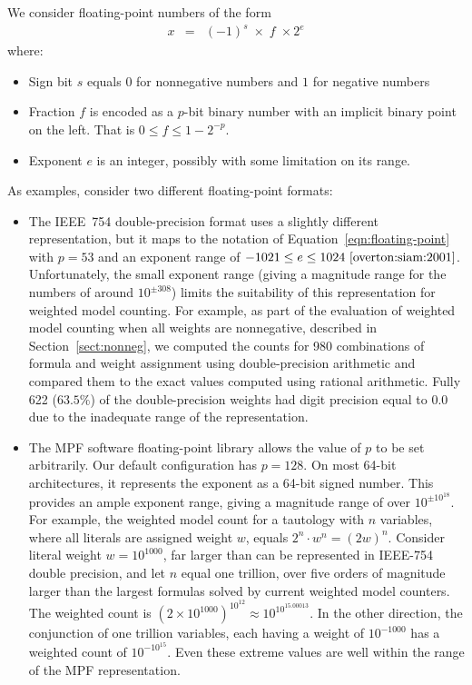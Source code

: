 \documentclass[letterpaper,USenglish,cleveref, autoref, thm-restate]{lipics-v2021}
\begin{document}
We consider floating-point numbers of the form
\begin{eqnarray}
x & = & (-1)^s \; \times \; f \; \times 2^{e} \label{eqn:floating-point}
\end{eqnarray}
where:
\begin{itemize}
\item Sign bit $s$ equals $0$ for nonnegative numbers and $1$ for negative numbers
\item Fraction $f$ is encoded as a $p$-bit binary number with an implicit binary point on the left.  That is $0 \leq f \leq 1-2^{-p}$.
\item Exponent $e$ is an integer, possibly with some limitation on its range.
\end{itemize}
As examples, consider two different floating-point formats:
\begin{itemize}
\item The IEEE~754 double-precision format uses a slightly different
  representation, but it maps to the notation of
  Equation~\ref{eqn:floating-point} with $p=53$ and an exponent range
  of $-1021 \leq e \leq 1024~\cite{overton:siam:2001}$.
  Unfortunately, the small exponent range (giving a magnitude range
  for the numbers of around $10^{\pm 308}$) limits the suitability of
  this representation for weighted model counting.  For example, as
  part of the evaluation of weighted model counting when all weights
  are nonnegative, described in Section~\ref{sect:nonneg}, we computed
  the counts for 980 combinations of formula and weight assignment
  using double-precision arithmetic and compared them to the exact
  values computed using rational arithmetic.  Fully 622 ($63.5\%$) of
  the double-precision weights had digit precision equal to $0.0$ due
  to the inadequate range of the representation.
\item The MPF software floating-point library allows the value of $p$
  to be set arbitrarily.  Our default configuration has $p=128$. On
  most 64-bit architectures, it represents the exponent as a 64-bit
  signed number.  This provides an ample exponent range, giving a
  magnitude range of over $10^{\pm 10^{18}}$.
  For example, the weighted model count for a tautology with $n$ variables, where all literals are assigned weight $w$, equals
  $2^n\cdot w^n = (2w)^n$.  Consider literal weight $w=10^{1000}$,
 far larger than can be represented in IEEE-754 double precision, and let $n$ equal one trillion, over five orders of magnitude
 larger than the largest formulas solved by current weighted model counters.  The weighted count is
 $(2 \times 10^{1000})^{10^{12}} \approx 10^{10^{15.00013}}$.  In the other direction, the conjunction of one trillion variables, each having a weight
 of $10^{-1000}$ has a weighted count of $10^{-10^{15}}$.  Even these extreme values are
 well within the range of the MPF representation.
\end{itemize}
\end{document}
